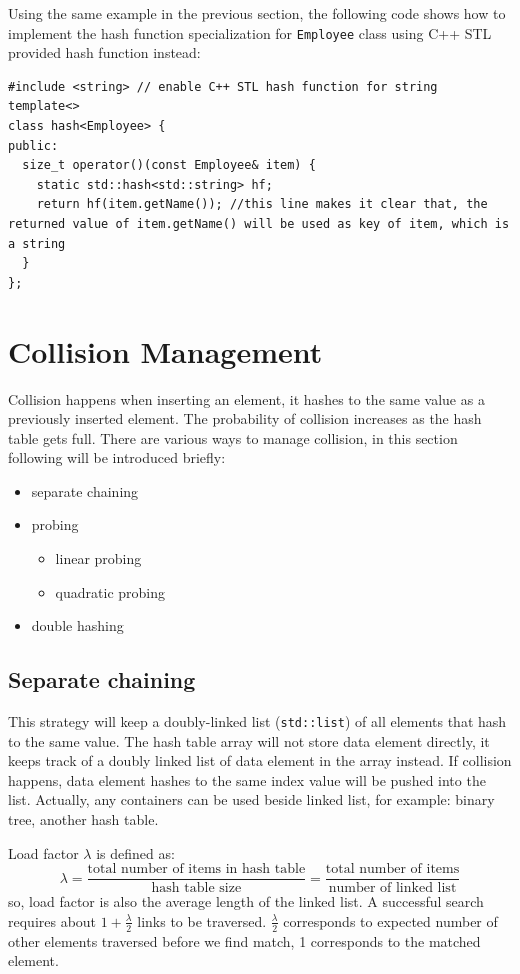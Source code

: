 \documentclass[11pt]{book}
\begin{document}
Using the same example in the previous section, the following code shows how to implement the hash function specialization for \texttt{Employee} class using C++ STL provided hash function instead:
\begin{verbatim}
#include <string> // enable C++ STL hash function for string
template<>
class hash<Employee> {
public:
  size_t operator()(const Employee& item) {
    static std::hash<std::string> hf;
    return hf(item.getName()); //this line makes it clear that, the returned value of item.getName() will be used as key of item, which is a string
  }
};
\end{verbatim}

\section{Collision Management}
\label{sec:orgb1e302b}
Collision happens when inserting an element, it hashes to the same value as a previously inserted element. The probability of collision increases as the hash table gets full. There are various ways to manage collision, in this section following will be introduced briefly:
\begin{itemize}
\item separate chaining
\item probing
\begin{itemize}
\item linear probing
\item quadratic probing
\end{itemize}
\item double hashing
\end{itemize}

\subsection{Separate chaining}
\label{sec:org549d1fd}

This strategy will keep a doubly-linked list (\texttt{std::list}) of all elements that hash to the same value. The hash table array will not store data element directly, it keeps track of a doubly linked list of data element in the array instead. If collision happens, data element hashes to the same index value will be pushed into the list. Actually, any containers can be used beside linked list, for example: binary tree, another hash table.

Load factor \(\lambda\) is defined as:
\[
\lambda = \frac {\text{total number of items in hash table}} {\text{hash table size}} = \frac {\text{total number of items}} {\text{number of linked list}}
\]
so, load factor is also the average length of the linked list. A successful search requires about \(1 + \frac {\lambda} {2}\) links to be traversed. \(\frac {\lambda} {2}\) corresponds to expected number of other elements traversed before we find match, 1 corresponds to the matched element.
\end{document}

